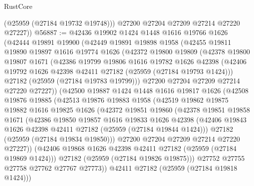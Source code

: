 \begin{lexlean}{RustCore}
\begin{coremodule}
          (@25959 (@27184 @19732 @19748)))
        @27200
        @27204
        @27209
        @27214
        @27220
        @27227))
@56887 := @42436
    @19902
    @1424
    @1448
    @1616
    @19766
    @1626
    (@42444
      @19891
      @19900
      (@42449
        @19891
        @19898
        @1958
        (@42455
          @19811
          @19890
          @19897
          @1616
          @19774
          @1626
          (@42372
            @19800
            @19809
            (@42378
              @19800
              @19807
              @1671
              (@42386
                @19799
                @19806
                @1616
                @19782
                @1626
                @42398
                (@42406 @19792 @1626 @42398 @42411 @27182 (@25959 (@27184 @19793 @1424)))
                @27182
                (@25959 (@27184 @19783 @19799)))
              @27200
              @27204
              @27209
              @27214
              @27220
              @27227))
          (@42500
            @19887
            @1424
            @1448
            @1616
            @19817
            @1626
            (@42508
              @19876
              @19885
              (@42513
                @19876
                @19883
                @1958
                (@42519
                  @19862
                  @19875
                  @19882
                  @1616
                  @19825
                  @1626
                  (@42372
                    @19851
                    @19860
                    (@42378
                      @19851
                      @19858
                      @1671
                      (@42386
                        @19850
                        @19857
                        @1616
                        @19833
                        @1626
                        @42398
                        (@42406 @19843 @1626 @42398 @42411 @27182 (@25959 (@27184 @19844 @1424)))
                        @27182
                        (@25959 (@27184 @19834 @19850)))
                      @27200
                      @27204
                      @27209
                      @27214
                      @27220
                      @27227))
                  (@42406 @19868 @1626 @42398 @42411 @27182 (@25959 (@27184 @19869 @1424)))
                  @27182
                  (@25959 (@27184 @19826 @19875)))
                @27752
                @27755
                @27758
                @27762
                @27767
                @27773))
            @42411
            @27182
            (@25959 (@27184 @19818 @1424)))

\end{coremodule}
\end{lexlean}
